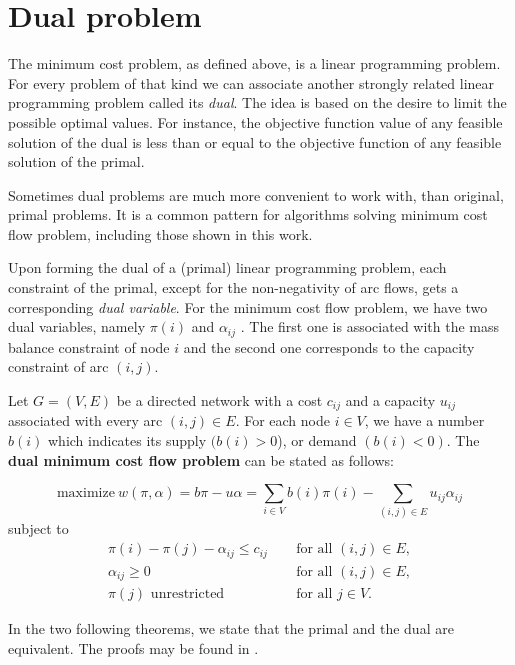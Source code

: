 \section{Dual problem}
The minimum cost problem, as defined above, is a linear programming problem. For every problem of that kind we can associate another strongly related linear programming problem called its \textit{dual}. The idea is based on the desire to limit the possible optimal values. For instance, the objective function value of any feasible solution of the dual is less than or equal to the objective function of any feasible solution of the primal.

Sometimes dual problems are much more convenient to work with, than original, primal problems. It is a common pattern for algorithms solving minimum cost flow problem, including those shown in this work.

Upon forming the dual of a (primal) linear programming problem, each constraint of the primal, except for the non-negativity of arc flows, gets a corresponding \textit{dual variable}. For the minimum cost flow problem, we have two dual variables, namely $\pi(i)$ and $\alpha_{ij}$ . The first one is associated with the mass balance constraint of node $i$ and the second one corresponds to the capacity constraint of arc $(i,j)$.

\begin{defn}
\label{dualdef}
Let $G=(V,E)$ be a directed network with a cost $c_{ij}$ and a capacity $u_{ij}$ associated with every arc $(i,j) \in E$. For each node $i \in V$, we have a number $b(i)$ which indicates its supply $(b(i) > 0$), or demand $(b(i) < 0)$. The \textbf{dual minimum cost flow problem} can be stated as follows:

\[
    \text{maximize}\ w(\pi, \alpha) = b\pi-u\alpha= \sum_{i \in V} b(i)\pi(i) - \sum_{(i,j) \in E} u_{ij}\alpha_{ij}
\]    
subject to
\begin{align*}
    \pi(i) - \pi(j) - \alpha_{ij} \leq c_{ij}\ \quad &\text{for all } (i,j)\in E,\\
 \alpha_{ij} \geq 0  \quad &\text{for all }(i,j) \in E, \\
\pi(j) \text{ unrestricted }&\text{for all } j\in V.
\end{align*}
\end{defn}

In the two following theorems, we state that the primal and the dual are equivalent. The proofs may be found in \cite[p.312--313]{ahuja1993network}.

